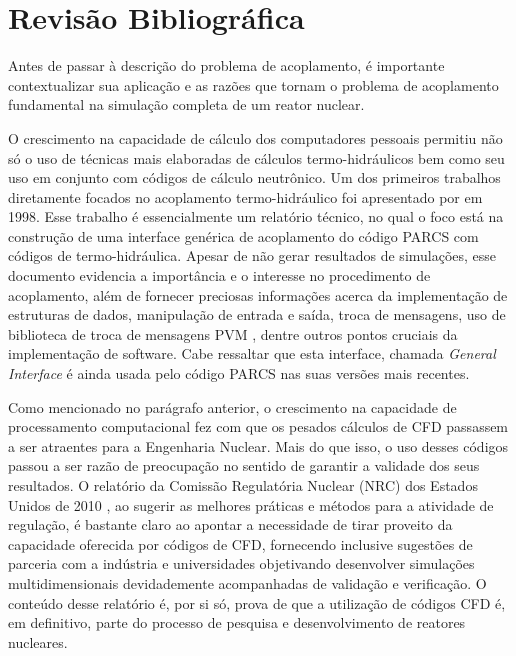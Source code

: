 \chapter*[Revisão Bibliográfica]{Revisão Bibliográfica}
\label{chap:rev}



Antes de passar à descrição do problema de acoplamento, é importante contextualizar sua 
aplicação e as razões que tornam o problema de acoplamento fundamental na simulação completa 
de um reator nuclear.

O crescimento na capacidade de cálculo dos computadores pessoais permitiu não só o uso 
de técnicas mais elaboradas de cálculos termo-hidráulicos bem como seu uso em conjunto 
com códigos de cálculo neutrônico. Um dos primeiros trabalhos diretamente focados no 
acoplamento termo-hidráulico foi apresentado por \cite{Barber98} em 1998. Esse trabalho 
é essencialmente um relatório técnico, no qual o foco está na construção de uma interface 
genérica de acoplamento do código PARCS com códigos de termo-hidráulica. Apesar de não 
gerar resultados de simulações, esse documento evidencia a importância e o interesse 
no procedimento de acoplamento, além de fornecer preciosas informações acerca da 
implementação de estruturas de dados, manipulação de entrada e saída, troca de mensagens, 
uso de biblioteca de troca de mensagens PVM \cite{Geist94}, dentre outros pontos cruciais
da implementação de software. Cabe ressaltar que esta interface, 
chamada \textit{General Interface} é ainda usada pelo código PARCS nas suas versões mais 
recentes. 

Como mencionado no parágrafo anterior, o crescimento na capacidade de processamento
computacional 
fez com que os pesados cálculos de CFD passassem a ser atraentes 
para a Engenharia Nuclear. Mais do que isso, o uso desses códigos passou a ser razão 
de preocupação no sentido de garantir a validade dos seus resultados. O relatório 
da Comissão Regulatória Nuclear (NRC) dos Estados Unidos de 2010 \cite[p.69]{NUREG2010}, 
ao sugerir as melhores práticas e métodos para a atividade de regulação, é bastante claro 
ao apontar a necessidade de tirar proveito da capacidade oferecida por códigos de CFD, 
fornecendo inclusive sugestões de parceria com a indústria e universidades objetivando 
desenvolver simulações multidimensionais devidademente acompanhadas de validação e
verificação. O conteúdo desse relatório é, por si só, prova de que a utilização de 
códigos CFD é, em definitivo, parte do processo de 
pesquisa e desenvolvimento de reatores nucleares. 

